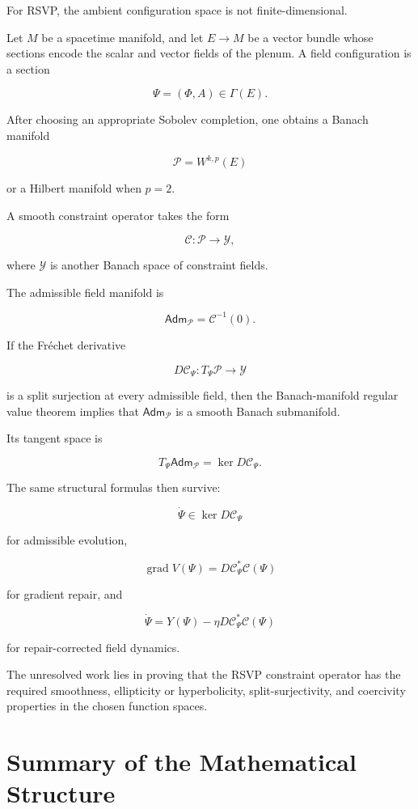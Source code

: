 \documentclass[11pt,oneside]{book}
\numberwithin{equation}{chapter}
\theoremstyle{definition}
\theoremstyle{plain}
\DeclareMathOperator{\grad}{grad}
\newcommand{\Adm}{\mathsf{Adm}}
\begin{document}
For RSVP, the ambient configuration space is not finite-dimensional.

Let \(M\) be a spacetime manifold, and let \(E\to M\) be a vector bundle
whose sections encode the scalar and vector fields of the plenum. A field
configuration is a section

\[
\Psi
=
(\Phi,A)
\in
\Gamma(E).
\]

After choosing an appropriate Sobolev completion, one obtains a Banach
manifold

\[
\mathcal P
=
W^{k,p}(E)
\]

or a Hilbert manifold when \(p=2\).

A smooth constraint operator takes the form

\[
\mathcal C:
\mathcal P
\longrightarrow
\mathcal Y,
\]

where \(\mathcal Y\) is another Banach space of constraint fields.

The admissible field manifold is

\[
\Adm_{\mathcal P}
=
\mathcal C^{-1}(0).
\]

If the Fréchet derivative

\[
D\mathcal C_{\Psi}:
T_{\Psi}\mathcal P
\longrightarrow
\mathcal Y
\]

is a split surjection at every admissible field, then the Banach-manifold
regular value theorem implies that
\(\Adm_{\mathcal P}\) is a smooth Banach submanifold.

Its tangent space is

\[
T_{\Psi}\Adm_{\mathcal P}
=
\ker D\mathcal C_{\Psi}.
\]

The same structural formulas then survive:

\[
\dot\Psi
\in
\ker D\mathcal C_{\Psi}
\]

for admissible evolution,

\[
\grad V(\Psi)
=
D\mathcal C_{\Psi}^{*}\mathcal C(\Psi)
\]

for gradient repair, and

\[
\dot\Psi
=
Y(\Psi)
-
\eta
D\mathcal C_{\Psi}^{*}\mathcal C(\Psi)
\]

for repair-corrected field dynamics.

The unresolved work lies in proving that the RSVP constraint operator has
the required smoothness, ellipticity or hyperbolicity, split-surjectivity,
and coercivity properties in the chosen function spaces.

\section{Summary of the Mathematical Structure}
\end{document}
